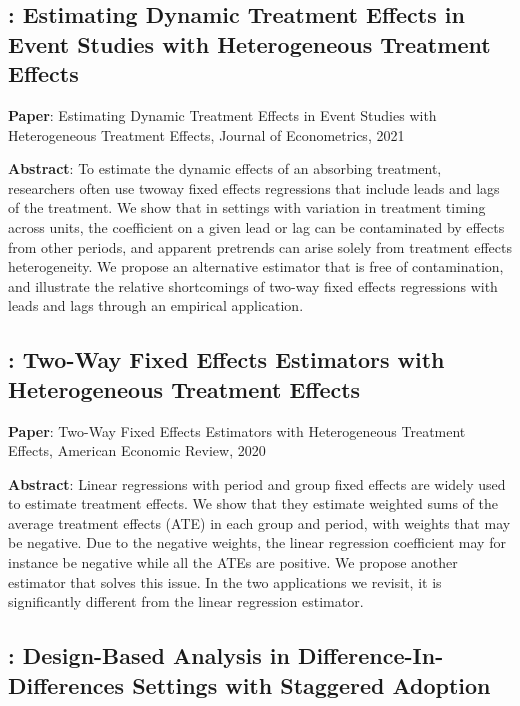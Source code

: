 \documentclass[12pt]{article}
\theoremstyle{definition}
\begin{document}
\subsection{\citet{sunEstimatingDynamicTreatment2021}: Estimating Dynamic Treatment Effects in Event Studies with Heterogeneous Treatment Effects}

{\bf Paper}: Estimating Dynamic Treatment Effects in Event Studies with Heterogeneous Treatment Effects, Journal of Econometrics, 2021

{\bf Abstract}: To estimate the dynamic effects of an absorbing treatment, researchers often use twoway fixed effects regressions that include leads and lags of the treatment. We show that in settings with variation in treatment timing across units, the coefficient on a given lead or lag can be contaminated by effects from other periods, and apparent pretrends can arise solely from treatment effects heterogeneity. We propose an alternative estimator that is free of contamination, and illustrate the relative shortcomings of two-way fixed effects regressions with leads and lags through an empirical application.

\subsection{\citet{dechaisemartinTwoWayFixedEffects2020}: Two-Way Fixed Effects Estimators with Heterogeneous Treatment Effects}

{\bf Paper}: Two-Way Fixed Effects Estimators with Heterogeneous Treatment Effects, American Economic Review, 2020

{\bf Abstract}: Linear regressions with period and group fixed effects are widely used to estimate treatment effects. We show that they estimate weighted sums of the average treatment effects (ATE) in each group and period, with weights that may be negative. Due to the negative weights, the linear regression coefficient may for instance be negative while all the ATEs are positive. We propose another estimator that solves this issue. In the two applications we revisit, it is significantly different from the linear regression estimator.

\subsection{\citet{atheyDesignBasedAnalysisDifferenceinDifferences2022a}: Design-Based Analysis in Difference-In-Differences Settings with Staggered Adoption}
\end{document}

